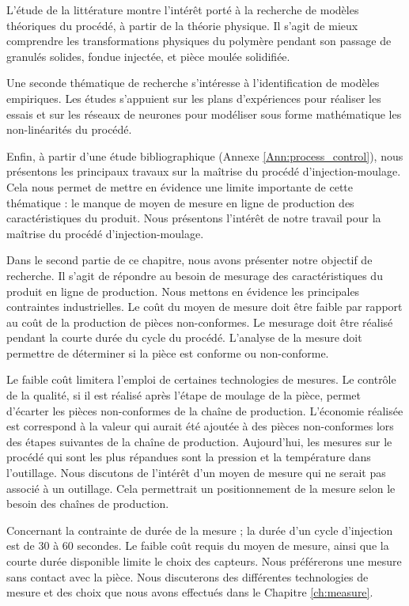 L'étude de la littérature montre l'intérêt porté à la recherche de modèles théoriques du procédé, à partir de la théorie physique.
Il s'agit de mieux comprendre les transformations physiques du polymère pendant son passage de granulés solides, fondue injectée, et pièce moulée solidifiée.

Une seconde thématique de recherche s'intéresse à l'identification de modèles empiriques.
Les études s'appuient sur les plans d'expériences pour réaliser les essais et sur les réseaux de neurones pour modéliser sous forme mathématique les non-linéarités du procédé.

Enfin, à partir d'une étude bibliographique (Annexe \ref{Ann:process_control}), nous présentons les principaux travaux sur la maîtrise du procédé d'injection-moulage.
Cela nous permet de mettre en évidence une limite importante de cette thématique : le manque de moyen de mesure en ligne de production des caractéristiques du produit.
Nous présentons l'intérêt de notre travail pour la maîtrise du procédé d'injection-moulage.

\smallskip

Dans le second partie de ce chapitre, nous avons présenter notre objectif de recherche.
Il s'agit de répondre au besoin de mesurage des caractéristiques du produit en ligne de production.
Nous mettons en évidence les principales contraintes industrielles.
Le coût du moyen de mesure doit être faible par rapport au coût de la production de pièces non-conformes.
Le mesurage doit être réalisé pendant la courte durée du cycle du procédé.
L'analyse de la mesure doit permettre de déterminer si la pièce est conforme ou non-conforme.

Le faible coût limitera l'emploi de certaines technologies de mesures.
Le contrôle de la qualité, si il est réalisé après l'étape de moulage de la pièce, permet d'écarter les pièces non-conformes de la chaîne de production.
L'économie réalisée est correspond à la valeur qui aurait été ajoutée à des pièces non-conformes lors des étapes suivantes de la chaîne de production.
Aujourd'hui, les mesures sur le procédé qui sont les plus répandues sont la pression et la température dans l'outillage.
Nous discutons de l'intérêt d'un moyen de mesure qui ne serait pas associé à un outillage.
Cela permettrait un positionnement de la mesure selon le besoin des chaînes de production.

Concernant la contrainte de durée de la mesure ; la durée d'un cycle d'injection est de 30 à 60 secondes.
Le faible coût requis du moyen de mesure, ainsi que la courte durée disponible limite le choix des capteurs.
Nous préférerons une mesure sans contact avec la pièce.
Nous discuterons des différentes technologies de mesure et des choix que nous avons effectués dans le Chapitre \ref{ch:measure}.

